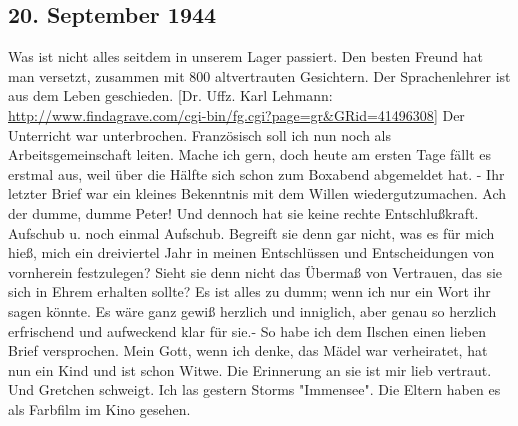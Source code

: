 \subsection{20. September 1944}

Was ist nicht alles seitdem in unserem Lager passiert.
Den besten Freund hat man versetzt, zusammen mit 800 altvertrauten Gesichtern.
Der Sprachenlehrer ist aus dem Leben geschieden. {\color{red} [Dr. Uffz. Karl Lehmann: \url{http://www.findagrave.com/cgi-bin/fg.cgi?page=gr&GRid=41496308}] }
Der Unterricht war unterbrochen.
Franz\"{o}sisch soll ich nun noch als Arbeitsgemeinschaft leiten.
Mache ich gern, doch heute am ersten Tage f\"{a}llt es erstmal aus, weil \"{u}ber die H\"{a}lfte sich schon zum Boxabend abgemeldet hat. -
Ihr letzter Brief war ein kleines Bekenntnis mit dem Willen wiedergutzumachen.
Ach der dumme, dumme Peter!
Und dennoch hat sie keine rechte Entschlu{\ss}kraft.
Aufschub u. noch einmal Aufschub.
Begreift sie denn gar nicht, was es f\"{u}r mich hie{\ss}, mich ein dreiviertel Jahr in meinen Entschl\"{u}ssen und Entscheidungen von vornherein festzulegen?
Sieht sie denn nicht das \"{U}berma{\ss} von Vertrauen, das sie sich in Ehrem erhalten sollte?
Es ist alles zu dumm; wenn ich nur ein Wort ihr sagen k\"{o}nnte.
Es w\"{a}re ganz gewi{\ss} herzlich und inniglich, aber genau so herzlich erfrischend und aufweckend klar f\"{u}r sie.-
So habe ich dem Ilschen einen lieben Brief versprochen.
Mein Gott, wenn ich denke, das M\"{a}del war verheiratet, hat nun ein Kind und ist schon Witwe.
Die Erinnerung an sie ist mir lieb vertraut.
Und Gretchen schweigt.
Ich las gestern Storms "Immensee".
Die Eltern haben es als Farbfilm im Kino gesehen.

\clearpage
